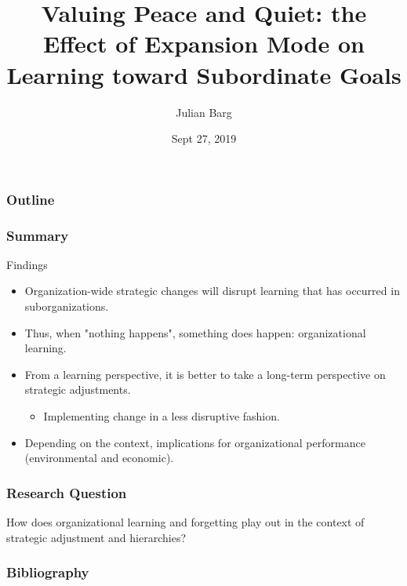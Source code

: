 \documentclass{beamer}
\title{Valuing Peace and Quiet: the Effect of Expansion Mode on Learning toward Subordinate Goals}
\author{Julian Barg}
\institute{Ivey Business School}
\date{Sept 27, 2019}
\begin{document}
	
\frame{\titlepage}

\begin{frame}
	\frametitle{Outline}
	\tableofcontents
\end{frame}

\begin{frame}
	\repository
\end{frame}

\begin{frame}
	\frametitle{Summary}
	\begin{block}{Findings}
		\begin{itemize}
			\item Organization-wide strategic changes will disrupt learning that has occurred in suborganizations.
			\item Thus, when "nothing happens", something does happen: organizational learning.
			\item From a learning perspective, it is better to take a long-term perspective on strategic adjustments.
				\begin{itemize}
					\item Implementing change in a less disruptive fashion.
				\end{itemize}
			\item Depending on the context, implications for organizational performance (environmental and economic).
		\end{itemize}
	\end{block}
\end{frame}



\begin{frame}
	\frametitle{Research Question}
	How does organizational learning and forgetting play out in the context of strategic adjustment and hierarchies?
\end{frame}











\begin{frame}[allowframebreaks]
	\frametitle{Bibliography}
	
	
\end{frame}
\end{document}
